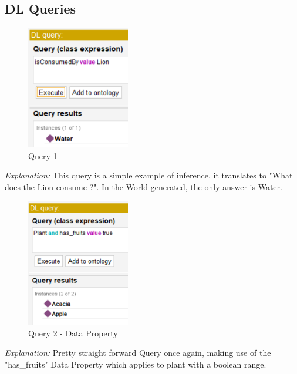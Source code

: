 \subsection{DL Queries}


\begin{figure}[H] %
  \centering
  \includegraphics[width=0.4\textwidth]{DL queries images/2-eau.png}
  \caption{Query 1}
  \label{fig:query1}
\end{figure}
\textit{Explanation:} This query is a simple example of inference, it translates to "What does the Lion consume ?". In the World generated, the only answer is Water.

\begin{figure}[H]
  \centering
  \includegraphics[width=0.4\textwidth]{DL queries images/5-has fruit.png}
  \caption{Query 2 - Data Property}
  \label{fig:query2}
\end{figure}

\textit{Explanation:} Pretty straight forward Query once again, making use of the "has\_fruits" Data Property which applies to plant with a boolean range.

